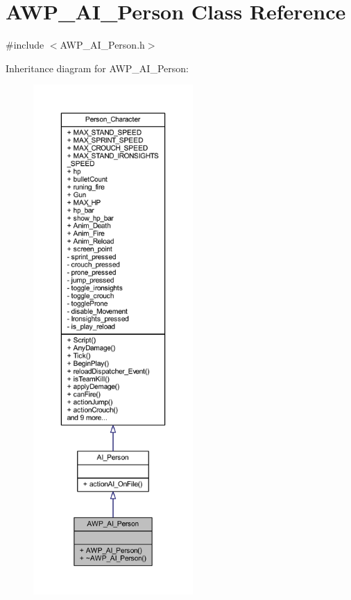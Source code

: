 \hypertarget{class_a_w_p___a_i___person}{}\section{A\+W\+P\+\_\+\+A\+I\+\_\+\+Person Class Reference}
\label{class_a_w_p___a_i___person}


{\ttfamily \#include $<$A\+W\+P\+\_\+\+A\+I\+\_\+\+Person.\+h$>$}



Inheritance diagram for A\+W\+P\+\_\+\+A\+I\+\_\+\+Person\+:\nopagebreak
\begin{figure}[H]
\begin{center}
\leavevmode
\includegraphics[height=550pt]{class_a_w_p___a_i___person__inherit__graph}
\end{center}
\end{figure}


